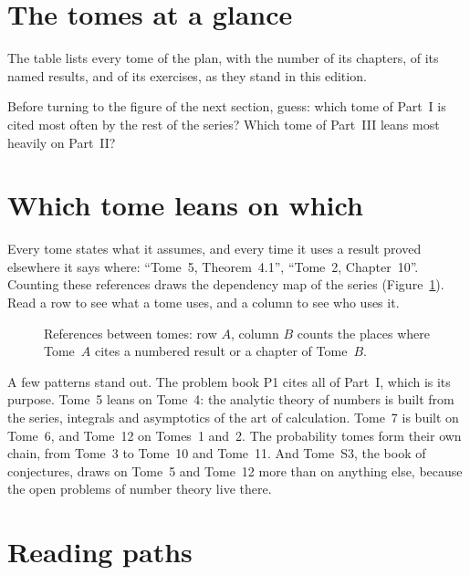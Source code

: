 \section{The tomes at a glance}

The table lists every tome of the plan, with the number of its chapters, of its named results, and of its exercises,
as they stand in this edition.



\begin{think}
Before turning to the figure of the next section, guess: which tome of Part~I is cited most often by the rest of the
series? Which tome of Part~III leans most heavily on Part~II?
\end{think}

\section{Which tome leans on which}

Every tome states what it assumes, and every time it uses a result proved elsewhere it says where: ``Tome~5,
Theorem~4.1'', ``Tome~2, Chapter~10''. Counting these references draws the dependency map of the series
(Figure~\ref{fig:citations}). Read a row to see what a tome uses, and a column to see who uses it.

\begin{figure}[ht]
\centering
\begin{minipage}{0.85\linewidth}\centering{}\end{minipage}
\caption{References between tomes: row $A$, column $B$ counts the places where Tome~$A$ cites a numbered result or a
chapter of Tome~$B$.}
\label{fig:citations}
\end{figure}

A few patterns stand out. The problem book P1 cites all of Part~I, which is its purpose. Tome~5 leans on Tome~4: the
analytic theory of numbers is built from the series, integrals and asymptotics of the art of calculation. Tome~7 is
built on Tome~6, and Tome~12 on Tomes~1 and~2. The probability tomes form their own chain, from Tome~3 to Tome~10 and
Tome~11. And Tome~S3, the book of conjectures, draws on Tome~5 and Tome~12 more than on anything else, because the open
problems of number theory live there.

\section{Reading paths}

